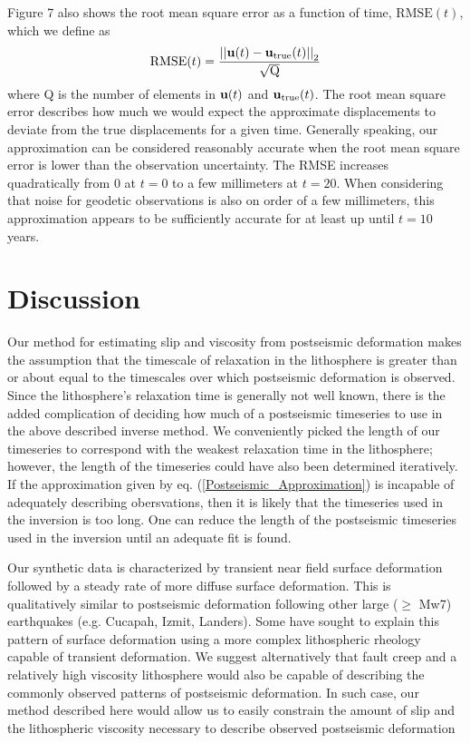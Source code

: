 \documentclass[12pt]{article}
\begin{document}
Figure 7 also shows the root mean square error as
a function of time, $\mathrm{RMSE}(t)$, which we define as
\begin{equation}
  \mathrm{RMSE}(t) = \frac{\left|\left|\bold{u}(t) -
    \bold{u}_{\mathrm{true}}(t)\right|\right|_2}{\sqrt{\mathrm{Q}}}
\end{equation}
where Q is the number of elements in $\bold{u}(t)$ and
$\bold{u}_{\mathrm{true}}(t)$.  The root mean square error describes
how much we would expect the approximate displacements to deviate from
the true displacements for a given time.  Generally speaking, our
approximation can be considered reasonably accurate when the root mean square error
is lower than the observation uncertainty.  The RMSE increases
quadratically from 0 at $t=0$ to a few millimeters at $t=20$.  When
considering that noise for geodetic observations is also on order of a
few millimeters, this approximation appears to be sufficiently
accurate for at least up until $t=10$ years.


\section{Discussion}

Our method for estimating slip and viscosity from postseismic
deformation makes the assumption that the timescale of relaxation in
the lithosphere is greater than or about equal to the timescales over
which postseismic deformation is observed.  Since the lithosphere's
relaxation time is generally not well known, there is the added
complication of deciding how much of a postseismic timeseries to use
in the above described inverse method.  We conveniently picked the
length of our timeseries to correspond with the weakest relaxation
time in the lithosphere; however, the length of the timeseries could
have also been determined iteratively.  If the approximation given by
eq. (\ref{Postseismic_Approximation}) is incapable of adequately
describing obersvations, then it is likely that the timeseries used in
the inversion is too long.  One can reduce the length of the
postseismic timeseries used in the inversion until an adequate fit is
found.

Our synthetic data is characterized by transient near field surface
deformation followed by a steady rate of more diffuse surface
deformation.  This is qualitatively similar to postseismic
deformation following other large ($\geq$ Mw7) earthquakes
(e.g. Cucapah, Izmit, Landers).  Some have sought to explain this
pattern of surface deformation using a more complex lithospheric
rheology capable of transient deformation. We suggest
alternatively that fault creep and a relatively high viscosity
lithosphere would also be capable of describing the commonly observed
patterns of postseismic deformation.  In such case, our method
described here would allow us to easily constrain the amount of slip
and the lithospheric viscosity necessary to describe observed
postseismic deformation
\end{document}
